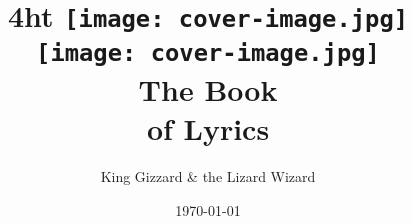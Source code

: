 \documentclass[a4paper,12pt,titlepage]{report}
\title{%
    \centering%
    \iftex4ht%
        \texttt{[image: cover-image.jpg]}\\[1em]%
    \else
        \texttt{[image: cover-image.jpg]}\\[2em]%
    \fi
    The Book\\%
    {\relscale{0.8} of Lyrics}%
}
\author{King Gizzard \& the Lizard Wizard}
\date{\today}
\renewcommand{\underline}[1]{%
    \uline{\phantom{#1}}%
    \llap{\contour{white}{#1}}%
}
\begin{document}
\newcommand{\epubnewpage}{%
    \iftex4ht\newpage\fi%
}

\newcommand{\lindex}[1]{%
  \lowercase{\def\temp{#1}}%
  \expandafter\index\expandafter{\temp}%
}

\newcommand{\album}[2][]{%
    \ifthenelse{\equal {#1}{}}%
    {\chapter[#2]{#2}}%
    {\chapter[#1]{#2}}%
    \vspace*{-1cm}%
    \nopagebreak%
}
\newcommand{\artwork}[1]{%
    \nopagebreak%
    \begin{center}%
		\iftex4ht%
			\texttt{[image: artworks/\#1]}%
		\else%
			\texttt{[image: artworks/\#1]}%
		\fi%
    \end{center}%
    \nopagebreak%
}
\newcommand{\released}[3]{%
    \nopagebreak%
    \begin{center}%
        \textit{Released: \shortdate\formatdate{#3}{#2}{#1}}%
    \end{center}%
    \iftex4ht%
        \epubnewpage%
    \fi%
    \nopagebreak%
}
\newcommand{\song}[2][]{%
    \ifthenelse{\equal {#1}{}}{%
        \section[#2]{#2}\index[songs]{#2}%
    }{%
        \section[#1]{#2}\index[songs]{#1}%
    }%
    \nopagebreak%
}
\newcommand{\writtenby}[1]{%
    \nopagebreak%
    \textscale{0.8}{[Written by: \emph{#1}]}\newline%
    \nopagebreak%
}
\newcommand{\note}[1]{%
    \nopagebreak%
    \emph{#1}\newline%
    \nopagebreak%
}
\newcommand{\word}[2][]{%
	\ifthenelse{\equal {#1}{}}%
	{\lindex{#2}}%
	{\lindex{#1}}%
	\underline{#2}%
}

\maketitle
\clearpage

\pagestyle{empty}
\end{document}
